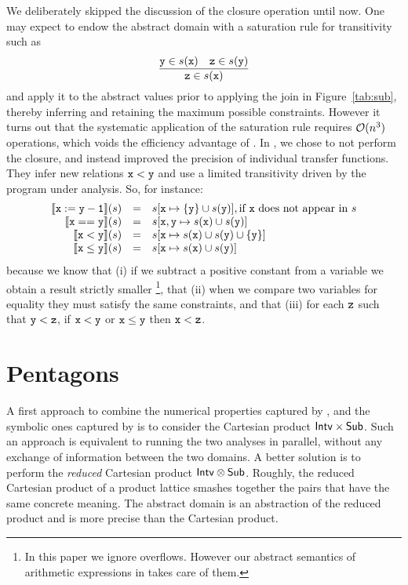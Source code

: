 \documentclass{elsart}
\begin{document}
We deliberately skipped the discussion of the closure operation until now.
One may expect to endow the \SUB{} abstract domain with a
saturation rule for transitivity such as
\[
\frac{\mathtt{y} \in s(\mathtt{x}) \quad \mathtt{z} \in s(\mathtt{y})}{\mathtt{z} \in s(\mathtt{x})}
\]
and apply it to the abstract values prior to applying the join in
Figure~\ref{tab:sub}, thereby inferring and retaining the maximum possible constraints.
However it turns out that the systematic application of the saturation
rule requires $\mathcal{O}(n^3)$ operations, which voids the efficiency
advantage of \Pentagons.
In \Clousot, we chose to not perform the closure, and instead improved
the precision of individual transfer functions.
 They infer new relations $\mathtt{x} < \mathtt{y}$ and use a limited transitivity driven by the program under analysis. 
So, for instance:
\[
\begin{array}{rcl}
\llbracket \mathtt{x := y - 1} \rrbracket(s) & = & s[\mathtt{x} \mapsto \{ \mathtt{y}\} \cup s(\mathtt{y})], \text{if \ensuremath{\mathtt{x}} does not appear in}\ s \\ 
\llbracket \mathtt{x == y} \rrbracket(s) & = & s[\mathtt{x}, \mathtt{y} \mapsto s(\mathtt{x}) \cup s(\mathtt{y})] \\
\llbracket \mathtt{x < y} \rrbracket(s) &=& s[\mathtt{x} \mapsto s(\mathtt{x}) \cup s(\mathtt{y}) \cup \{ \mathtt{y}\}] \\
\llbracket \mathtt{x \leq y} \rrbracket(s) &=& s[\mathtt{x} \mapsto s(\mathtt{x}) \cup s(\mathtt{y})]  
\end{array}
\]
because we know that (i) if we subtract a positive constant from a
variable we obtain a result strictly smaller \footnote{In this paper
  we ignore overflows. However our abstract semantics of arithmetic
  expressions in \Clousot{} takes care of them.}, that (ii) when we
compare two variables for equality they must satisfy the same
constraints, and that (iii) for each $\mathtt{z}$ such that $\mathtt{y} <
\mathtt{z}$, if  $\mathtt{x} < \mathtt{y}$ or $\mathtt{x} \leq \mathtt{y}$ then
$\mathtt{x} < \mathtt{z}$. 

\section{Pentagons}
A first approach to combine the numerical properties captured by
\Intervals, and the symbolic ones captured by \SUB{} is to consider
the Cartesian product  $\mathsf{Intv} \times \mathsf{Sub}$. 
Such an approach is equivalent to running the two analyses in
parallel, without any exchange of information between the two
domains. 
A better solution is to perform the \emph{reduced} Cartesian product
$\mathsf{Intv} \otimes \mathsf{Sub}$. 
Roughly, the reduced Cartesian product of a product lattice smashes together
the pairs that have the same concrete meaning.
The \Pentagons{} abstract domain is an abstraction of the reduced
product and is more precise than the Cartesian product. 
\end{document}
